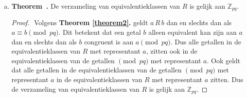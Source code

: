 \documentclass[12pt, dutch, a4paper]{article}
\theoremstyle{definition}
\newenvironment{shortthm}
  {\refstepcounter{theorem}\textbf{Theorem~\thetheorem.}}%
{\enskip}
\begin{document}
\begin{enumerate}[(a).]
  Dit is een biconditionele implicatie, dus de implicatie moet allebei de kanten op gelden.
  Eerst bewijs ik de implicatie van links naar rechts, 
  dat wil zeggen $a\,R\,b$ impliceert $a \equiv b \pmod{pq}$.

  \begin{proof} $ $ \newline
    Neem aan $a\,R\,b$. \newline
    Dan geldt vanuit de definitie van $R$ dat $p \mid b - a$ en $q \mid b - a$. 

    Omdat $p$ en $q$ priemgetallen zijn, kunnen dit geen delers van elkaar zijn. \newline
    Omdat geldt $p \mid b - a$ \'en $q \mid b - a$, 
    kunnen we $b - a$ schrijven als $b - a = kpq$ voor een $k \in \mathbb{Z}$.

    Dus $b - a \equiv 0 \pmod{pq}$ en $b \equiv a \pmod{pq}$. \newline
  \end{proof}

  Om het bewijs van \textbf{Theorem \ref{theorem2}.} af te maken, 
  bewijzen we nu de implicatie de andere kant op. 
  Dat wil zeggen $a \equiv b \pmod{pq}$ impliceert $a\,R\,b$.
  
  \begin{proof} $ $ \newline
    Neem aan $a \equiv b \pmod{pq}$. \newline
    Dus $a - b \equiv 0 \pmod{pq}$. \newline
    Dus $b - a \equiv 0 \pmod{pq}$. \newline
    Dus $pq \mid b - a$. \newline  
    Dan kunnen we $  - a$ schrijven als $b - a = kpq$ voor een $k \in \mathbb{Z}$. \newline
    Dus $p \mid b - a$ en $q \mid b - a$. \newline
  \end{proof}

  \item 
  \begin{shortthm}
    De verzameling van equivalentieklassen van $R$ is gelijk aan $\mathbb{Z}_{pq}$.
  \end{shortthm}

  \begin{proof} $ $ \newline
    Volgens \textbf{Theorem \ref{theorem2}.} geldt $a\,R\,b$ dan en slechts dan als 
    $a \equiv b \pmod{pq}$. 
    Dit betekent dat een getal $b$ alleen equivalent kan zijn aan $a$ dan en slechts dan 
    als $b$ congruent is aan $a \pmod{pq}$.
    Dus alle getallen in de equivalentieklassen van $R$ met representant $a$,
    zitten ook in de equivalentieklassen van de getallen $\pmod{pq}$ met representant $a$. 
    Ook geldt dat  
    alle getallen in de equivalentieklassen van de getallen $\pmod{pq}$ met representant $a$
    in de equivalentieklassen van $R$ met representant $a$ zitten. 
    Dus de verzameling van equivalentieklassen van $R$ is gelijk aan $\mathbb{Z}_{pq}$.  
    \newline
  \end{proof}
\end{enumerate}
\end{document}
